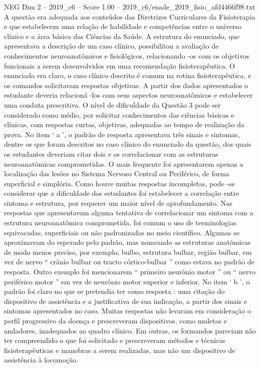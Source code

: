 \begin{textsample}{NEG Dim 2 – 2019\_c6 – Score 1.00 – 2019\_c6/enade\_2019\_fisio\_afd4466f98.txt}
A questão era adequada aos conteúdos das Diretrizes Curriculares da Fisioterapia e que estabelecem uma relação de habilidade e competências entre o universo clínico e a área básica das Ciências da Saúde.
A estrutura do enunciado, que apresentava a descrição de um caso clínico, possibilitou a avaliação de conhecimentos neuroanatômicos e fisiológicos, relacionando -os com os objetivos funcionais a serem desenvolvidos em uma recomendação fisioterapêutica.
O enunciado era claro, o caso clínico descrito é comum na rotina fisioterapêutica, e os comandos solicitavam respostas objetivas.
A partir dos dados apresentados o estudante deveria relacioná -los com seus aspectos neuroanatômicos e estabelecer uma conduta prescritiva.
O nível de dificuldade da Questão 3 pode ser considerado como médio, por solicitar conhecimentos das ciências básicas e clínicas, com respostas curtas, objetivas, adequadas ao tempo de realização da prova.
No item ‘ a ’, o padrão de resposta apresentava três sinais e sintomas, dentre os que foram descritos no caso clínico do enunciado da questão, dos quais os estudantes deveriam citar dois e os correlacionar com as estruturas neuroanatômicas comprometidas.
O mais frequente foi apresentarem apenas a localização das lesões no Sistema Nervoso Central ou Periférico, de forma superficial e simplória.
Como houve muitas respostas incompletas, pode -se considerar que a dificuldade dos estudantes foi estabelecer a correlação entre sintoma e estrutura, por requerer um maior nível de aprofundamento.
Nas respostas que apresentavam alguma tentativa de correlacionar um sintoma com a estrutura neuroanatômica comprometida, foi comum o uso de terminologias equivocadas, superficiais ou não padronizadas no meio científico.
Algumas se aproximavam do esperado pelo padrão, mas nomeando as estruturas anatômicas de modo menos preciso, por exemplo, bulbo, estrutura bulbar, região bulbar, em vez de nervo “ crânio bulbar ou tracto córtico-bulbar ” como estava no padrão de resposta.
Outro exemplo foi mencionarem “ primeiro neurônio motor ” ou “ nervo periférico motor ” em vez de neurônio motor superior e inferior.
No item ‘ b ’, o padrão foi claro no que se pretendia ter como resposta : uma citação do dispositivo de assistência e a justificativa de sua indicação, a partir dos sinais e sintomas apresentados no caso.
Muitas respostas não levaram em consideração o perfil progressivo da doença e prescreveram dispositivos, como muletas e andadores, inadequados ao quadro clínico.
Em outras, os formandos pareciam não ter compreendido o que foi solicitado e prescreveram métodos e técnicas fisioterapêuticas e manobras a serem realizadas, mas não um dispositivo de assistência à locomoção.

\end{textsample}
